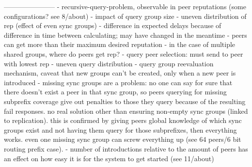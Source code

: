 -----------------------
- recursive-query-problem, observable in peer reputations (some configurations?
  see 8/about)
- impact of query group size
- uneven distribution of rep (effect of even sync groups)
- difference in expected delays because of difference in time between
  calculating; may have changed in the meantime
- peers can get more than their maximum desired reputation
- in the case of multiple shared groups, where do peers get rep?
- query peer selection: must send to peer with lowest rep
- uneven query distribution
- query group reevaluation mechanism, caveat that new groups can't be created,
  only when a new peer is introduced
- missing sync groups are a problem: no one can say for sure that there doesn't
  exist a peer in that sync group, so peers querying for missing subprefix
  coverage give out penalties to those they query because of the resulting fail
  responses. no real solution other than ensuring non-empty sync groups (linked
  to replication). this is confirmed by giving peers global knowledge of which
  sync groups exist and not having them query for those subprefixes, then
  everything works. even one missing sync group can screw everything up (see 64
  peers/6 bit routing prefix case).
- number of introductions relative to the amount of peers has an effect on how
  easy it is for the system to get started (see 11/about)
